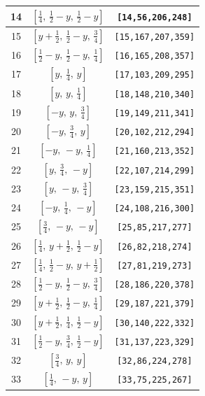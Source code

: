 \documentclass[fleqn,8pt]{jsarticle}
\begin{document}
\begin{longtable}{ccc}
14 & $\left[ \frac{1}{4},\, \frac{1}{2} - y,\, \frac{1}{2} - y \right]$ & {\tt [14,56,206,248]} \\ \hline
15 & $\left[ y + \frac{1}{2},\, \frac{1}{2} - y,\, \frac{3}{4} \right]$ & {\tt [15,167,207,359]} \\ \hline
16 & $\left[ \frac{1}{2} - y,\, \frac{1}{2} - y,\, \frac{1}{4} \right]$ & {\tt [16,165,208,357]} \\ \hline
17 & $\left[ y,\, \frac{1}{4},\, y \right]$ & {\tt [17,103,209,295]} \\ \hline
18 & $\left[ y,\, y,\, \frac{1}{4} \right]$ & {\tt [18,148,210,340]} \\ \hline
19 & $\left[ - y,\, y,\, \frac{3}{4} \right]$ & {\tt [19,149,211,341]} \\ \hline
20 & $\left[ - y,\, \frac{3}{4},\, y \right]$ & {\tt [20,102,212,294]} \\ \hline
21 & $\left[ - y,\, - y,\, \frac{1}{4} \right]$ & {\tt [21,160,213,352]} \\ \hline
22 & $\left[ y,\, \frac{3}{4},\, - y \right]$ & {\tt [22,107,214,299]} \\ \hline
23 & $\left[ y,\, - y,\, \frac{3}{4} \right]$ & {\tt [23,159,215,351]} \\ \hline
24 & $\left[ - y,\, \frac{1}{4},\, - y \right]$ & {\tt [24,108,216,300]} \\ \hline
25 & $\left[ \frac{3}{4},\, - y,\, - y \right]$ & {\tt [25,85,217,277]} \\ \hline
26 & $\left[ \frac{1}{4},\, y + \frac{1}{2},\, \frac{1}{2} - y \right]$ & {\tt [26,82,218,274]} \\ \hline
27 & $\left[ \frac{1}{4},\, \frac{1}{2} - y,\, y + \frac{1}{2} \right]$ & {\tt [27,81,219,273]} \\ \hline
28 & $\left[ \frac{1}{2} - y,\, \frac{1}{2} - y,\, \frac{3}{4} \right]$ & {\tt [28,186,220,378]} \\ \hline
29 & $\left[ y + \frac{1}{2},\, \frac{1}{2} - y,\, \frac{1}{4} \right]$ & {\tt [29,187,221,379]} \\ \hline
30 & $\left[ y + \frac{1}{2},\, \frac{1}{4},\, \frac{1}{2} - y \right]$ & {\tt [30,140,222,332]} \\ \hline
31 & $\left[ \frac{1}{2} - y,\, \frac{3}{4},\, \frac{1}{2} - y \right]$ & {\tt [31,137,223,329]} \\ \hline
32 & $\left[ \frac{3}{4},\, y,\, y \right]$ & {\tt [32,86,224,278]} \\ \hline
33 & $\left[ \frac{1}{4},\, - y,\, y \right]$ & {\tt [33,75,225,267]} \\ \hline

\end{longtable}
\end{document}
